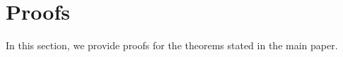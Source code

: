 \onecolumn

\section{\label{sec:proofs}Proofs}

In this section, we provide proofs for the theorems stated in the main paper.





